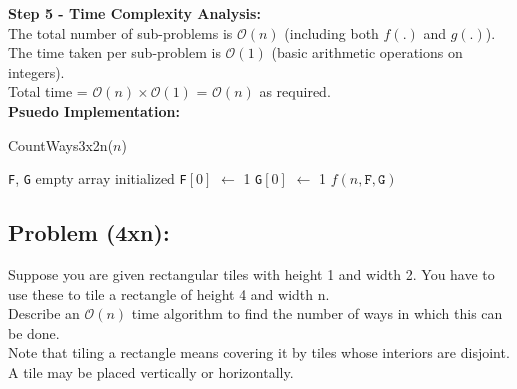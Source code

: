 \documentclass[11pt, fleqn]{article}
\begin{document}
\textbf{Step 5 - Time Complexity Analysis:}\\
The total number of sub-problems is $\mathcal{O}(n)$ (including both $f(.)$ and $g(.)$).\\
The time taken per sub-problem is $\mathcal{O}(1)$ (basic arithmetic operations on integers).\\
Total time = $\mathcal{O}(n) \times \mathcal{O}(1)$ = $\mathcal{O}(n)$ as required.\\

\textbf{Psuedo Implementation:}\\
\begin{algorithm}[H]
    \SetAlgoLined
    \DontPrintSemicolon
    
    \caption{CountWays3x2n($n$)}



    \;
    \;
    \texttt{F}, \texttt{G} empty array initialized\;
    \texttt{F}$[0]$ $\leftarrow$ 1\;
    \texttt{G}$[0]$ $\leftarrow$ 1\;
    \;
    \KwRet $f(n, \texttt{F}, \texttt{G})$\;
\end{algorithm}

\subsection*{Problem (4xn):}
Suppose you are given rectangular tiles with height 1 and width 2. You have to use these to tile a rectangle of height 4 and width n. \\
Describe an $\mathcal{O}(n)$ time algorithm to find the number of ways in which this can be done. \\
Note that tiling a rectangle means covering it by tiles whose interiors are disjoint. A tile may be placed vertically or horizontally. 
\end{document}

